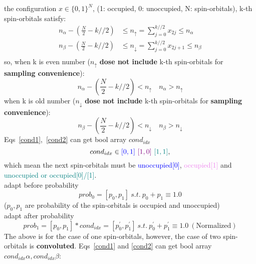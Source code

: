 the configuration $x \in \{0, 1\}^{N}$, (1: occupied, 0: unoccupied, N: spin-orbitals),
k-th spin-orbitals satisfy:
\begin{equation}
    \begin{split}
        n_{\alpha} - \left(\frac{N}{2} - k//2\right) &
            \leq n_{\uparrow} = \sum_{j=0}^{k//2}x_{2j} \leq n_{\alpha} \\
        n_{\beta} - \left(\frac{N}{2} - k//2\right) &
            \leq n_{\downarrow} = \sum_{j=0}^{k//2}x_{2j+1} \leq n_{\beta} \\
    \end{split}
\end{equation}
so, when k is even number ($n_{\uparrow}$ \textbf{dose not include} k-th spin-orbitals for \textbf{sampling convenience}):
\begin{equation}
    n_{\alpha} - \left(\frac{N}{2} - k//2\right) < n_{\uparrow} \quad n_{\alpha} > n_{\uparrow} \label{cond1}
\end{equation}
when k is old number  ($n_{\downarrow}$ \textbf{dose not include} k-th spin-orbitals for \textbf{sampling convenience}):
\begin{equation}
    n_{\beta} - \left(\frac{N}{2} - k//2\right) < n_{\downarrow} \quad n_{\beta} > n_{\downarrow} \label{cond2}
\end{equation}
Eqs\ \ref{cond1},\ \ref{cond2} can get bool array $cond_{idx}$
\begin{equation}
 cond_{idx} \in \textcolor{blue}{[0, 1]} \ \textcolor{violet}{[1, 0]}\ \textcolor{teal}{[1, 1]},
\end{equation}
which mean the next spin-orbitals must be \textcolor{blue}{unoccupied[0]},
\textcolor{violet}{occupied[1]} and \textcolor{teal}{unoccupied or occupied[0]/[1]}.\\
adapt before probability 
\begin{equation}
    prob_0 = [p_0, p_1] \ s.t.\ p_0 + p_1 \equiv 1.0
\end{equation}
($p_0, p_1$ are probability of the spin-orbitals is occupied and unoccupied)\\
adapt after probability
\begin{equation}
prob_1 =[p_0, p_1] * cond_{idx} = [p_0^{\prime}, p_1^{\prime}] 
    \ s.t.\ p_0^{\prime} + p_1^{\prime} \equiv 1.0 \ (\textrm{Normalized})
\end{equation}
\indent The above is for the case of one spin-orbitals, however, 
the case of two spin-orbitals is \textbf{convoluted}.
Eqs\ \ref{cond1} and \ref{cond2} can get bool array $cond_{idx}\alpha, cond_{idx}\beta$:
